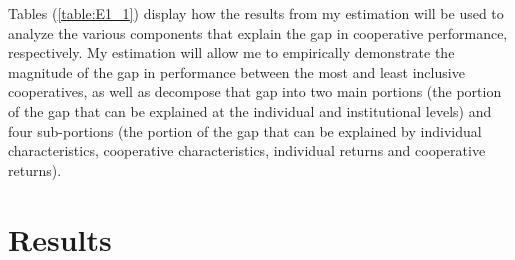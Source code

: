 \documentclass[11pt]{article}
\begin{document}
        \begin{table}[H]
        \caption{Individual vs. Institutional Decomposition}
        \label{table:E1_1}
        \centering
        \end{table}   
        

Tables (\ref{table:E1_1}) display how the results from my estimation will be used to analyze the various components that explain the gap in cooperative performance, respectively. My estimation will allow me to empirically demonstrate the magnitude of the gap in performance between the most and least inclusive cooperatives, as well as decompose that gap into two main portions (the portion of the gap that can be explained at the individual and institutional levels) and four sub-portions (the portion of the gap that can be explained by individual characteristics, cooperative characteristics, individual returns and cooperative returns). 


\section{Results}
\end{document}

